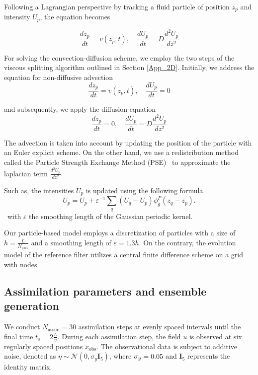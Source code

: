 Following a Lagrangian perspective by tracking a fluid particle of position $z_p$ and intensity $U_p$, the equation becomes

\begin{equation*}
	\frac{dz_p}{dt} = v(z_p, t), \quad \frac{dU_p}{dt} = D \frac{d^2 U_p}{dz^2}
\end{equation*}

For solving the convection-diffusion scheme, we employ the two steps of the viscous splitting algorithm outlined in Section \ref{App_2D}. Initially, we address the equation for non-diffusive advection
\begin{equation*}
	\frac{dz_p}{dt} = v(z_p, t), \quad \frac{dU_p}{dt} = 0
\end{equation*}

and subsequently, we apply the diffusion equation
\begin{equation*}
	\frac{dz_p}{dt} = 0, \quad \frac{dU_p}{dt} = D \frac{d^2 U_p}{dz^2}
\end{equation*}

The advection is taken into account by updating the position of the particle with an Euler explicit scheme. %
On the other hand, we use a redistribution method called the Particle Strength Exchange Method (PSE)~\cite{degond_1989,cottet_1990} to approximate the laplacian term $\frac{d^2 U_p}{dz^2}$.

Such as, the intensities $U_p$ is updated using the following formula
\begin{equation*}
	U_p = U_p + \varepsilon^{-1} \sum_{q} (U_q - U_p) \phi_g^P(z_q - z_p).
\end{equation*}~with $\varepsilon$ the smoothing length of the Gaussian periodic kernel.

Our particle-based model employs a discretization of \npart{} particles with a size of $h = \frac{L}{N_{\text{part}}}$ and a smoothing length of $\varepsilon = 1.3 h$.
On the contrary, the evolution model of the reference filter utilizes a central finite difference scheme on a grid with \ngrid{} nodes.

\subsection{Assimilation parameters and ensemble generation}

We conduct $N_{\text{assim}} = 30$ assimilation steps at evenly spaced intervals until the final time $t_s = 2 \frac{L}{v}$. During each assimilation step, the field $u$ is observed at six regularly spaced positions $x_{\text{obs}}$. The observational data is subject to additive noise, denoted as $\eta \sim \mathcal{N}(0, \sigma_y \bm{I}_5)$, where $\sigma_y = 0.05$ and $\bm{I}_5$ represents the identity matrix.

